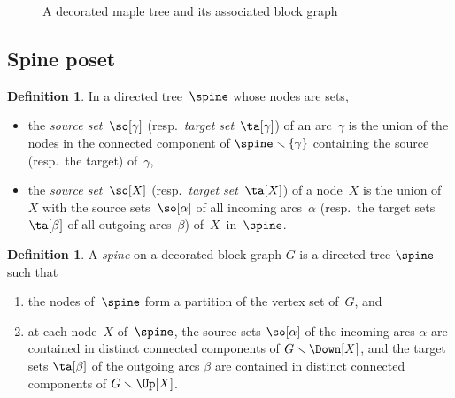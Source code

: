 \documentclass{amsart}
\theoremstyle{definition}
\newtheorem{definition}[theorem]{Definition}
\newcommand{\ssm}{\smallsetminus} %
\newcommand{\darkblue}{\color{darkblue}} %
\newcommand{\defn}[1]{\textsl{\darkblue #1}} %
\newcommand{\vincent}[1]{\todo[color=blue!30]{#1 \\ \hfill --- V.}}
\begin{document}
\begin{figure}
{}
\caption{A decorated maple tree and its associated block graph}
\label{fig:mapleBlock}
\end{figure} 


\subsection{Spine poset}

\begin{definition}
  In a directed tree~$\spine$ whose nodes are sets,
  \begin{itemize}
    \item the \defn{source set}~$\so[\gamma]$ (resp.~\defn{target set}~$\ta[\gamma]$) of an arc~$\gamma$ is the union of the nodes in the connected component of $\spine \ssm \{\gamma\}$ containing the source (resp.~the target) of~$\gamma$,
    \item the \defn{source set}~$\so[X]$ (resp.~\defn{target set}~$\ta[X]$) of a node~$X$ is the union of~$X$ with the source sets~$\so[\alpha]$ of all incoming arcs~$\alpha$ (resp.~the target sets~$\ta[\beta]$ of all outgoing arcs~$\beta$) of~$X$~in~$\spine$.
  \end{itemize}
\end{definition}


\begin{definition}
  \label{def:spine}
  A \defn{spine} on a decorated block graph $G$ is a directed tree $\spine$ such that
  \begin{enumerate}
    \item the nodes of~$\spine$ form a partition of the vertex set of~$G$, and 
    \item at each node~$X$ of~$\spine$, the source sets $\so[\alpha]$ of the incoming arcs $\alpha$ are contained in distinct connected components of $G \ssm \Down[X]$, and the target sets $\ta[\beta]$ of the outgoing arcs $\beta$ are contained in distinct connected components of $G \ssm \Up[X]$.
  \end{enumerate}
\end{definition}
\end{document}
